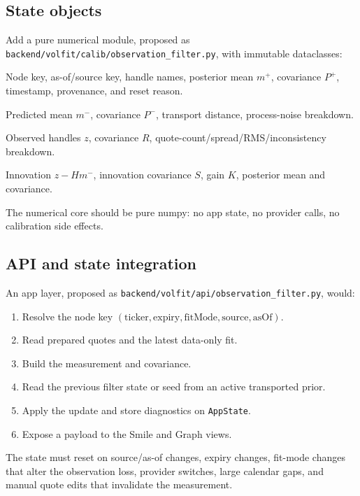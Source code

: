 \documentclass[11pt]{article}
\begin{document}
\subsection{State objects}

Add a pure numerical module, proposed as
\nolinkurl{backend/volfit/calib/observation_filter.py}, with immutable
dataclasses:
\begin{description}[leftmargin=1.7em,style=nextline]
\item[\texttt{FilterState}.]
Node key, as-of/source key, handle names, posterior mean $m^+$, covariance
$P^+$, timestamp, provenance, and reset reason.
\item[\texttt{FilterPrediction}.]
Predicted mean $m^-$, covariance $P^-$, transport distance, process-noise
breakdown.
\item[\texttt{FilterMeasurement}.]
Observed handles $z$, covariance $R$, quote-count/spread/RMS/inconsistency
breakdown.
\item[\texttt{FilterUpdate}.]
Innovation $z-Hm^-$, innovation covariance $S$, gain $K$, posterior mean and
covariance.
\end{description}

The numerical core should be pure numpy: no app state, no provider calls, no
calibration side effects.

\subsection{API and state integration}

An app layer, proposed as \nolinkurl{backend/volfit/api/observation_filter.py},
would:
\begin{enumerate}[leftmargin=1.6em]
\item Resolve the node key $(\mathrm{ticker},\mathrm{expiry},\mathrm{fitMode},
\mathrm{source},\mathrm{asOf})$.
\item Read prepared quotes and the latest data-only fit.
\item Build the measurement and covariance.
\item Read the previous filter state or seed from an active transported prior.
\item Apply the update and store diagnostics on \texttt{AppState}.
\item Expose a payload to the Smile and Graph views.
\end{enumerate}

The state must reset on source/as-of changes, expiry changes, fit-mode changes
that alter the observation loss, provider switches, large calendar gaps, and
manual quote edits that invalidate the measurement.
\end{document}
